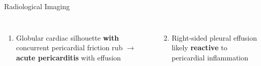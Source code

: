 \begin{frame}{Radiological Imaging}
  \begin{tcolorbox}[highlightbox,title={\faLightbulb\hspace{4pt}Key Imaging Impressions}]
    \small
    \begin{columns}[T]
      \begin{enumerate}
        \item Globular cardiac silhouette \textbf{with} concurrent pericardial friction rub $\rightarrow$ \textbf{acute pericarditis} with effusion
      \end{enumerate}
      \begin{enumerate}
        \setcounter{enumi}{1}
        \item Right-sided pleural effusion likely \textbf{reactive} to pericardial inflammation
      \end{enumerate}
    \end{columns}
  \end{tcolorbox}
\end{frame}
